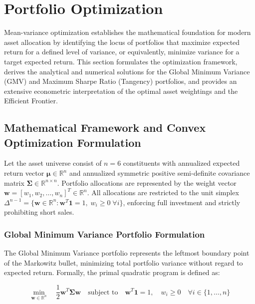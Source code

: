 \section{Portfolio Optimization}

Mean-variance optimization establishes the mathematical foundation for modern asset allocation by identifying the locus of portfolios that maximize expected return for a defined level of variance, or equivalently, minimize variance for a target expected return. This section formulates the optimization framework, derives the analytical and numerical solutions for the Global Minimum Variance (GMV) and Maximum Sharpe Ratio (Tangency) portfolios, and provides an extensive econometric interpretation of the optimal asset weightings and the Efficient Frontier.

\subsection{Mathematical Framework and Convex Optimization Formulation}

Let the asset universe consist of $n = 6$ constituents with annualized expected return vector $\boldsymbol{\mu} \in \mathbb{R}^n$ and annualized symmetric positive semi-definite covariance matrix $\boldsymbol{\Sigma} \in \mathbb{R}^{n \times n}$. Portfolio allocations are represented by the weight vector $\mathbf{w} = [w_1, w_2, \dots, w_n]^T \in \mathbb{R}^n$. All allocations are restricted to the unit simplex $\Delta^{n-1} = \{ \mathbf{w} \in \mathbb{R}^n : \mathbf{w}^T \mathbf{1} = 1, \; w_i \ge 0 \; \forall i \}$, enforcing full investment and strictly prohibiting short sales.

\subsubsection{Global Minimum Variance Portfolio Formulation}

The Global Minimum Variance portfolio represents the leftmost boundary point of the Markowitz bullet, minimizing total portfolio variance without regard to expected return. Formally, the primal quadratic program is defined as:

\begin{equation}
  \min_{\mathbf{w} \in \mathbb{R}^n} \quad \frac{1}{2} \mathbf{w}^T \boldsymbol{\Sigma} \mathbf{w} \quad \text{subject to} \quad \mathbf{w}^T \mathbf{1} = 1, \quad w_i \ge 0 \quad \forall i \in \{1, \dots, n\}
\end{equation}

